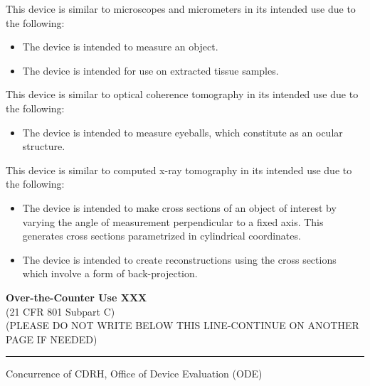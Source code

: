\onehalfspacing

This device is similar to microscopes and micrometers in its intended
use due to the following:
\begin{itemize}
\item The device is intended to measure an object.
\item The device is intended for use on extracted tissue samples. \\
\end{itemize}

This device is similar to optical coherence tomography in its intended
use due to the following:
\begin{itemize}
\item The device is intended to measure eyeballs, which constitute as
  an ocular structure. \\
\end{itemize}

This device is similar to computed x-ray tomography in its intended use
due to the following:
\begin{itemize}
\item The device is intended to make cross sections of an object of
  interest by varying the angle of measurement perpendicular to a
  fixed axis. This generates cross sections parametrized in
  cylindrical coordinates.
\item The device is intended to create reconstructions using the cross
  sections which involve a form of back-projection. 
\end{itemize}

\vfill

\noindent \textbf{Over-the-Counter Use XXX} \\
(21 CFR 801 Subpart C)\\[1em]

\noindent (PLEASE DO NOT WRITE BELOW THIS LINE-CONTINUE ON ANOTHER PAGE IF
NEEDED)

\rule{\linewidth}{0.5mm}
\begin{center}
  Concurrence of CDRH, Office of Device Evaluation (ODE)
\end{center}

\vspace{5em}


